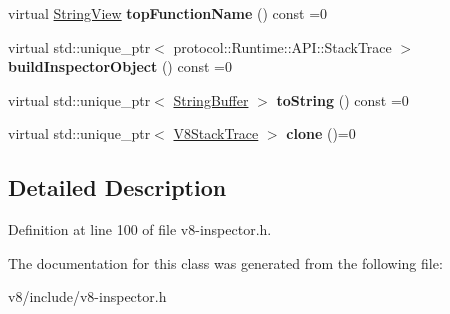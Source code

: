 \begin{DoxyCompactItemize}
virtual \mbox{\hyperlink{classv8__inspector_1_1StringView}{String\+View}} {\bfseries top\+Function\+Name} () const =0
\item 
\mbox{\label{classv8__inspector_1_1V8StackTrace_a6dbec10e0db0c650f43465f75c35c8e3}} 
virtual std\+::unique\+\_\+ptr$<$ protocol\+::\+Runtime\+::\+A\+P\+I\+::\+Stack\+Trace $>$ {\bfseries build\+Inspector\+Object} () const =0
\item 
\mbox{\label{classv8__inspector_1_1V8StackTrace_a05bb91a501d40686481c4971b4dee7f9}} 
virtual std\+::unique\+\_\+ptr$<$ \mbox{\hyperlink{classv8__inspector_1_1StringBuffer}{String\+Buffer}} $>$ {\bfseries to\+String} () const =0
\item 
\mbox{\label{classv8__inspector_1_1V8StackTrace_a5d03e8bfb799b8ced2bfd5c31615d64a}} 
virtual std\+::unique\+\_\+ptr$<$ \mbox{\hyperlink{classv8__inspector_1_1V8StackTrace}{V8\+Stack\+Trace}} $>$ {\bfseries clone} ()=0
\end{DoxyCompactItemize}


\subsection{Detailed Description}


Definition at line 100 of file v8-\/inspector.\+h.



The documentation for this class was generated from the following file\+:\begin{DoxyCompactItemize}
\item 
v8/include/v8-\/inspector.\+h\end{DoxyCompactItemize}
